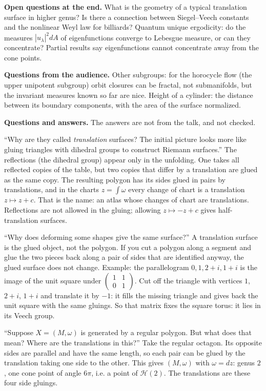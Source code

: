 \medskip\noindent
{\bf Open questions at the end.} What is the
geometry of a typical translation surface in
higher genus? Is there a connection between
Siegel--Veech constants and the nonlinear
Weyl law for billiards? Quantum unique
ergodicity: do the measures $|u_\lambda|^2dA$
of eigenfunctions converge to Lebesgue
measure, or can they concentrate? Partial
results say eigenfunctions cannot concentrate
away from the cone points.

\medskip\noindent
{\bf Questions from the audience.} Other
subgroups: for the horocycle flow (the upper
unipotent subgroup) orbit closures can be
fractal, not submanifolds, but the invariant
measures known so far are nice. Height of a
cylinder: the distance between its boundary
components, with the area of the surface
normalized.

\medskip\noindent
{\bf Questions and answers.} The answers
are not from the talk, and not checked.

``Why are they called \emph{translation}
surfaces? The initial picture looks more like
gluing triangles with dihedral groups to
construct Riemann surfaces.'' The reflections
(the dihedral group) appear only in the
unfolding. One takes all reflected copies of
the table, but two copies that differ by a
translation are glued as the same copy. The
resulting polygon has its sides glued in
pairs by translations, and in the charts
$z=\int\omega$ every change of chart is a
translation $z\mapsto z+c$. That is the name:
an atlas whose changes of chart are
translations. Reflections are not allowed in
the gluing; allowing $z\mapsto -z+c$ gives
half-translation surfaces.

``Why does deforming some shapes give the
same surface?'' A
translation surface is the glued object, not
the polygon. If you cut a polygon along a
segment and glue the two pieces back along a
pair of sides that are identified anyway, the
glued surface does not change. Example: the
parallelogram $0,1,2+i,1+i$ is the image of
the unit square under
$\left(\begin{smallmatrix}1&1\\
0&1\end{smallmatrix}\right)$.
Cut off the triangle with vertices $1$,
$2+i$, $1+i$ and translate it by $-1$: it
fills the missing triangle and gives back the
unit square with the same gluings. So that
matrix fixes the square torus: it lies in its
Veech group.

``Suppose $X=(M,\omega)$ is generated by a
regular polygon. But what does that mean?
Where are the translations in this?'' Take
the regular octagon. Its opposite sides are
parallel and have the same length, so each
pair can be glued by the translation taking
one side to the other. This gives
$(M,\omega)$ with $\omega=dz$: genus $2$, one
cone point of angle $6\pi$, i.e. a point of
$\mathcal{H}(2)$. The translations are these
four side gluings.

